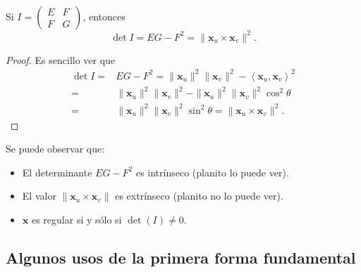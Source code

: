 \begin{prop}
	Si $\displaystyle I = \begin{pmatrix} E & F \\ F & G \end{pmatrix} $, entonces
	\[\det I = EG-F^{2}=\| \textbf{x} _{u} \times \textbf{x} _{v}\|^{2} .\]
\end{prop}
\begin{proof}
Es sencillo ver que
\[
\begin{split}
	\det I = & EG-F^{2} = \| \textbf{x} _{u}\|^{2} \| \textbf{x} _{v}\|^{2}-\left\langle \textbf{x} _{u}, \textbf{x} _{v} \right\rangle ^{2} \\
	= &  \| \textbf{x} _{u} \|^{2}\| \textbf{x} _{v}\|^{2}-\| \textbf{x} _{u}\|^{2}\| \textbf{x} _{v}\|^{2}\cos ^{2}\theta \\
	= & \| \textbf{x} _{u}\|^{2}\| \textbf{x} _{v}\|^{2}\sin ^{2}\theta = \| \textbf{x} _{u} \times \textbf{x} _{v}\|^{2}.
\end{split}
\]
\end{proof}
\begin{observation}
Se puede observar que: 
\begin{itemize}
\item El determinante $\displaystyle EG-F^{2} $ es intrínseco (planito lo puede ver).
\item El valor $\displaystyle \| \textbf{x} _{u} \times \textbf{x} _{v}\| $ es extrínseco (planito no lo puede ver).
\item $\displaystyle \textbf{x}  $ es regular si y sólo si $\displaystyle \det\left(I\right)\neq 0 $.
\end{itemize}
\end{observation}
\subsection*{Algunos usos de la primera forma fundamental}

